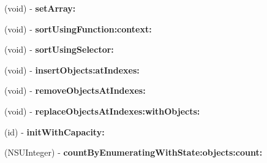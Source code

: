 \begin{DoxyCompactItemize}
\item 
\hypertarget{interfaceget_prepared_medications_for_patient_response_aa79a4d3ff9b3447ecb9ef74aac526b4d}{}(void) -\/ {\bfseries set\+Array\+:}\label{interfaceget_prepared_medications_for_patient_response_aa79a4d3ff9b3447ecb9ef74aac526b4d}

\item 
\hypertarget{interfaceget_prepared_medications_for_patient_response_a5d9eef5f1e1962e31934e67696a59d12}{}(void) -\/ {\bfseries sort\+Using\+Function\+:context\+:}\label{interfaceget_prepared_medications_for_patient_response_a5d9eef5f1e1962e31934e67696a59d12}

\item 
\hypertarget{interfaceget_prepared_medications_for_patient_response_a81c7e9d9167efd1cb6a18cd9335b9c69}{}(void) -\/ {\bfseries sort\+Using\+Selector\+:}\label{interfaceget_prepared_medications_for_patient_response_a81c7e9d9167efd1cb6a18cd9335b9c69}

\item 
\hypertarget{interfaceget_prepared_medications_for_patient_response_a6e3fa8397eb1e2f19088a5f3f5faf493}{}(void) -\/ {\bfseries insert\+Objects\+:at\+Indexes\+:}\label{interfaceget_prepared_medications_for_patient_response_a6e3fa8397eb1e2f19088a5f3f5faf493}

\item 
\hypertarget{interfaceget_prepared_medications_for_patient_response_a00b59d9cf4dcb93fbd2bc2237c887284}{}(void) -\/ {\bfseries remove\+Objects\+At\+Indexes\+:}\label{interfaceget_prepared_medications_for_patient_response_a00b59d9cf4dcb93fbd2bc2237c887284}

\item 
\hypertarget{interfaceget_prepared_medications_for_patient_response_a9221dc1909871bd23b6acd1ba87a80a5}{}(void) -\/ {\bfseries replace\+Objects\+At\+Indexes\+:with\+Objects\+:}\label{interfaceget_prepared_medications_for_patient_response_a9221dc1909871bd23b6acd1ba87a80a5}

\item 
\hypertarget{interfaceget_prepared_medications_for_patient_response_a791d0bd6578fc9248c2eb446cd7aaeda}{}(id) -\/ {\bfseries init\+With\+Capacity\+:}\label{interfaceget_prepared_medications_for_patient_response_a791d0bd6578fc9248c2eb446cd7aaeda}

\item 
\hypertarget{interfaceget_prepared_medications_for_patient_response_a2833f215e95a8b20d6304c71ffb40815}{}(N\+S\+U\+Integer) -\/ {\bfseries count\+By\+Enumerating\+With\+State\+:objects\+:count\+:}\label{interfaceget_prepared_medications_for_patient_response_a2833f215e95a8b20d6304c71ffb40815}


\end{DoxyCompactItemize}
